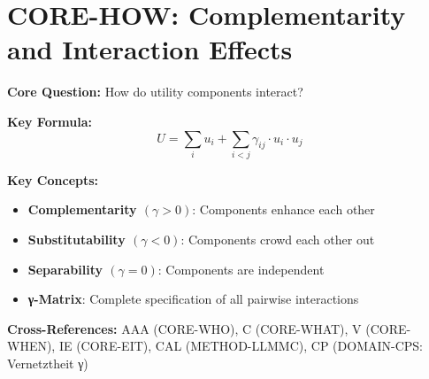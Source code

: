 
\chapter{CORE-HOW: Complementarity and Interaction Effects}
\label{app:core-how}

\begin{abstract}
This appendix answers the third fundamental question of the Evidence-Based Framework:
\textit{``How do utility components interact?''} Standard economics assumes additive
separability --- components contribute independently. We reject this assumption and
formalize the complementarity parameter $\gamma_{ij} \in [-1, +1]$, capturing synergies
($\gamma > 0$) and crowding-out ($\gamma < 0$) between utility dimensions and welfare
levels. The axiom system CMP-1 through CMP-10 provides the formal foundations.
This interaction structure is essential for understanding non-concave utility,
intervention portfolio design, and emergence phenomena.
\end{abstract}


\begin{tcolorbox}[colback=blue!5!white, colframe=blue!75!black,
    title=Quick Reference: CORE-HOW]

\textbf{Core Question:} How do utility components interact?

\textbf{Key Formula:}
\begin{equation}
U = \sum_i u_i + \sum_{i < j} \gamma_{ij} \cdot u_i \cdot u_j
\label{eq:how-utility}
\end{equation}

\textbf{Key Concepts:}
\begin{itemize}[nosep]
\item \textbf{Complementarity $(\gamma > 0)$}: Components enhance each other
\item \textbf{Substitutability $(\gamma < 0)$}: Components crowd each other out
\item \textbf{Separability $(\gamma = 0)$}: Components are independent
\item \textbf{γ-Matrix}: Complete specification of all pairwise interactions
\end{itemize}

\textbf{Cross-References:}
AAA (CORE-WHO), C (CORE-WHAT), V (CORE-WHEN), IE (CORE-EIT), CAL (METHOD-LLMMC), CP (DOMAIN-CPS: Vernetztheit γ)

\end{tcolorbox}


